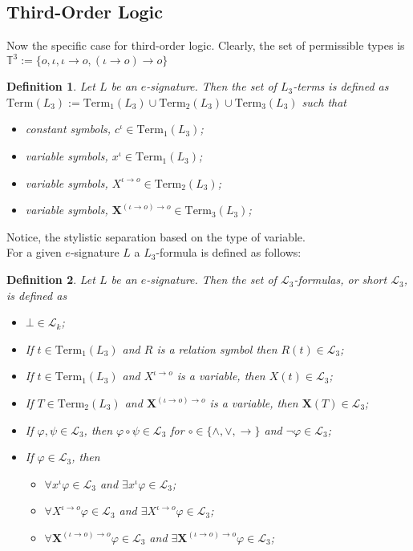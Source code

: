\documentclass[11pt,a4paper]{article}
\newtheorem{mydef}{Definition}
\newcommand{\of}{\iota }
\newcommand{\os}{\iota \to o}
\newcommand{\ot}{(\iota \to o)\to o}
\begin{document}
\subsection*{Third-Order Logic}
Now the specific case for third-order logic. Clearly, the set of permissible types is $\mathbb{T}^3:= \{o, \iota, \iota	\to o, (\iota	\to o) \to o \}$
\begin{mydef}
Let $L$ be an $e$-signature. Then the set of $L_3$-terms is defined as $\mathrm{Term}(L_3):= \mathrm{Term}_{1} (L_3)\cup \mathrm{Term}_{2}(L_3) \cup \mathrm{Term}_{3}(L_3)$ such that
\begin{itemize}
\item  constant symbols, $c^{\of} \in \mathrm{Term}_1(L_3)$;
\item  variable symbols, $x^{\of} \in \mathrm{Term}_1(L_3)$;
\item  variable symbols, $X^{\os} \in \mathrm{Term}_2(L_3)$;
\item  variable symbols, $\mathbf{X}^{\ot} \in \mathrm{Term}_3(L_3)$;
\end{itemize} 
\end{mydef}
Notice, the stylistic separation based on the type of variable. \\

For a given $e$-signature $L$ a $L_3$-formula is defined as follows:
\begin{mydef}
Let $L$ be an $e$-signature. Then the set of $\mathcal{L}_3$-formulas, or short $\mathcal{L}_3$, is defined as
\begin{itemize}
\item $\bot \in \mathcal{L}_k$;
\item If $t \in \mathrm{Term}_1(L_3)$ and $R$ is a relation symbol then $R(t)\in \mathcal{L}_3$;
\item If $t \in \mathrm{Term}_{1}(L_3)$ and $X^{\os}$ is a variable,  then $X(t) \in \mathcal{L}_3$;
\item If $T \in \mathrm{Term}_{2}(L_3)$ and $\mathbf{X}^{\ot}$ is a variable,  then $\mathbf{X}(T) \in \mathcal{L}_3$;
\item If $\varphi , \psi \in \mathcal{L}_3$, then $\varphi \circ \psi \in \mathcal{L}_3$ for $\circ \in \{\land, \lor , \to \}$ and $\neg \varphi \in \mathcal{L}_3$;
\item If $\varphi \in  \mathcal{L}_3$, then 
\begin{itemize}
\item $\forall x^{\of} \varphi \in \mathcal{L}_3$ and $\exists x^{\of} \varphi \in \mathcal{L}_3$;
\item $\forall X^{\os} \varphi \in \mathcal{L}_3$ and $\exists X^{\os} \varphi \in \mathcal{L}_3$;
\item $\forall \mathbf{X}^{\ot} \varphi \in \mathcal{L}_3$ and $\exists \mathbf{X}^{\ot} \varphi \in \mathcal{L}_3$;
\end{itemize}


\end{itemize} 
\end{mydef}
\end{document}
